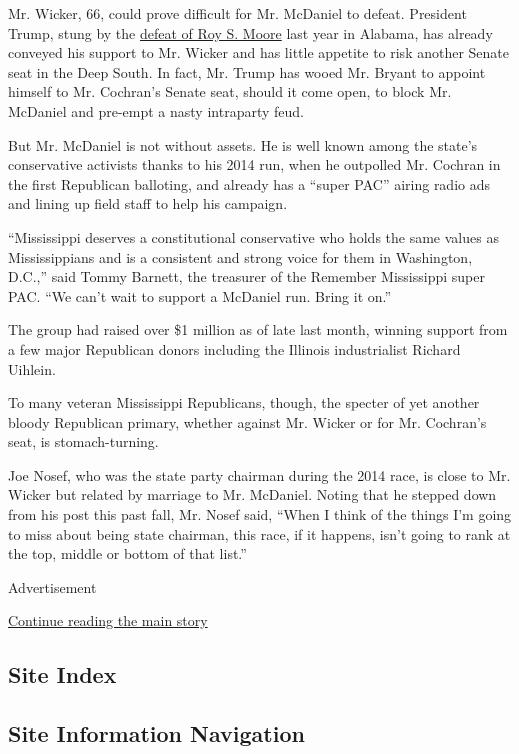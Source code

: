 Mr. Wicker, 66, could prove difficult for Mr. McDaniel to defeat.
President Trump, stung by the
\href{https://www.nytimes3xbfgragh.onion/2017/12/12/us/politics/alabama-senate-race-winner.html}{defeat
of Roy S. Moore} last year in Alabama, has already conveyed his support
to Mr. Wicker and has little appetite to risk another Senate seat in the
Deep South. In fact, Mr. Trump has wooed Mr. Bryant to appoint himself
to Mr. Cochran's Senate seat, should it come open, to block Mr. McDaniel
and pre-empt a nasty intraparty feud.

But Mr. McDaniel is not without assets. He is well known among the
state's conservative activists thanks to his 2014 run, when he outpolled
Mr. Cochran in the first Republican balloting, and already has a ``super
PAC'' airing radio ads and lining up field staff to help his campaign.

``Mississippi deserves a constitutional conservative who holds the same
values as Mississippians and is a consistent and strong voice for them
in Washington, D.C.,'' said Tommy Barnett, the treasurer of the Remember
Mississippi super PAC. ``We can't wait to support a McDaniel run. Bring
it on.''

The group had raised over \$1 million as of late last month, winning
support from a few major Republican donors including the Illinois
industrialist Richard Uihlein.

To many veteran Mississippi Republicans, though, the specter of yet
another bloody Republican primary, whether against Mr. Wicker or for Mr.
Cochran's seat, is stomach-turning.

Joe Nosef, who was the state party chairman during the 2014 race, is
close to Mr. Wicker but related by marriage to Mr. McDaniel. Noting that
he stepped down from his post this past fall, Mr. Nosef said, ``When I
think of the things I'm going to miss about being state chairman, this
race, if it happens, isn't going to rank at the top, middle or bottom of
that list.''

Advertisement

\protect\hyperlink{after-bottom}{Continue reading the main story}

\hypertarget{site-index}{%
\subsection{Site Index}\label{site-index}}

\hypertarget{site-information-navigation}{%
\subsection{Site Information
Navigation}\label{site-information-navigation}}

